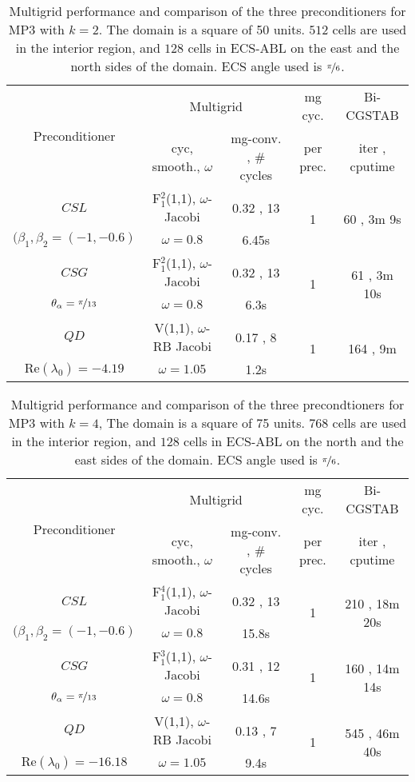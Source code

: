 \documentclass[mathpazo]{cicp}
\theoremstyle{definition}
\numberwithin{equation}{section}
\begin{document}
\begin{table}[!h]
 \begin{tabular}{|c|c|c|c|c|} \hline 
  \multirow{2}{*}{Preconditioner} & \multicolumn{2}{c|}{Multigrid} & mg cyc. & Bi-CGSTAB\\ \cline{2-3}
 & cyc, smooth., $\omega$ & mg-conv. , \# cycles & per prec. & iter , cputime \\ \hline
$CSL$ & F$_1^2$(1,1), $\omega$-Jacobi & 0.32 , 13 & \multirow{2}{*}{1} & \multirow{2}{*}{60 , 3m 9s}\\
$(\beta_1, \beta_2 = (-1, -0.6)$ & $\omega = 0.8$ & 6.45s & & \\ \hline
$CSG$ & F$_1^2$(1,1), $\omega$-Jacobi & 0.32 , 13 & \multirow{2}{*}{1} & \multirow{2}{*}{61 , 3m 10s}\\
$\theta_{\alpha} = \nicefrac{\pi}{13}$ & $\omega = 0.8$ & 6.3s & & \\ \hline
$QD$ & V(1,1), $\omega$-RB Jacobi & 0.17 , 8 & \multirow{2}{*}{1} & \multirow{2}{*}{164 , 9m}\\
$\text{Re}(\lambda_0) = -4.19$ & $\omega = 1.05$ & 1.2s & & \\ \hline
 \end{tabular}
\caption{Multigrid performance and comparison of the three preconditioners for MP3 with $k=2$. The domain is a square of 50 units. $512$ cells are used in the interior region, and $128$ cells in ECS-ABL on the east and the north sides of the domain. ECS angle used is $\nicefrac{\pi}{6}$.}
\label{tab:exp3}
\end{table}

\begin{table}
 \begin{tabular}{|c|c|c|c|c|} \hline 
  \multirow{2}{*}{Preconditioner} & \multicolumn{2}{c|}{Multigrid} & mg cyc. & Bi-CGSTAB\\ \cline{2-3}
 & cyc, smooth., $\omega$ & mg-conv. , \# cycles & per prec. & iter , cputime \\ \hline
$CSL$ & F$_1^4$(1,1), $\omega$-Jacobi & 0.32 , 13 & \multirow{2}{*}{1} & \multirow{2}{*}{210 , 18m 20s}\\
$(\beta_1, \beta_2 = (-1, -0.6)$ & $\omega = 0.8$ & 15.8s & & \\ \hline
$CSG$ & F$_1^3$(1,1), $\omega$-Jacobi & 0.31 , 12 & \multirow{2}{*}{1} & \multirow{2}{*}{160 , 14m 14s}\\
$\theta_{\alpha} = \nicefrac{\pi}{13}$ & $\omega = 0.8$ & 14.6s & & \\ \hline
$QD$ & V(1,1), $\omega$-RB Jacobi & 0.13 , 7 & \multirow{2}{*}{1} & \multirow{2}{*}{545 , 46m 40s}\\
$\text{Re}(\lambda_0) = -16.18$ & $\omega = 1.05$ & 9.4s & & \\ \hline
 \end{tabular}
\caption{Multigrid performance and comparison of the three precondtioners for MP3 with $k=4$, The domain is a square of 75 units. $768$ cells are used in the interior region, and $128$ cells in ECS-ABL on the north and the east sides of the domain. ECS angle used is $\nicefrac{\pi}{6}$.}
\label{tab:exp4}
\end{table}
\end{document}
